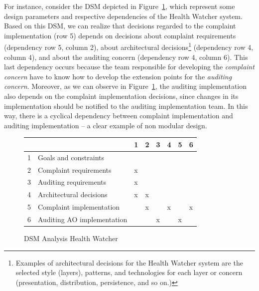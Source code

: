 For instance, consider the DSM depicted in Figure~\ref{dsm:hw01}, which represent
some design parameters and respective dependencies of the Health Watcher
system. Based on this DSM, we can realize that decisions regarded to the
complaint implementation (row 5) depends on decisions about complaint
requirements (dependency row 5, column 2), about architectural
decisions\footnote{Examples of architectural decisions for the Health Watcher
system are the selected style (layers), patterns, and technologies for each
layer or concern (presentation, distribution, persistence, and so on.)}
(dependency row 4, column 4), and about the auditing concern (dependency row 4,
column 6). This last dependency occurs because the team responsible for developing
the \emph{complaint concern} have to know how to develop the extension points for
the \emph{auditing concern}. Moreover, as we can observe in
Figure~\ref{dsm:hw01}, the auditing implementation also depends on the
complaint implementation decisions, since changes in its implementation should
be notified to the auditing implementation team. In this way, there is a
cyclical dependency between complaint implementation and auditing
implementation -- a clear example of non modular design.

\begin{figure}[htb]
\centering
\begin{scriptsize}
\begin{tabular}{|l|l|l|l|l|l|l|l|} \hline
  &                             & 1     & 2     & 3     & 4     & 5     & 6 \\ \hline
1 & Goals and constraints       &       &       &       &       &       &   \\ \hline
2 & Complaint requirements      & x     &       &       &       &       &   \\ \hline
3 & Auditing requirements       & x     &       &       &       &       &   \\ \hline
4 & Architectural decisions     & x     & x     &       &       &       &   \\ \hline
5 & Complaint implementation    &       & x     &       & x     &       & x \\ \hline
6 & Auditing AO implementation  &       &       & x     &       & x     &   \\  \hline
\end{tabular}
\end{scriptsize}
\caption{DSM Analysis Health Watcher}
\label{dsm:hw01}
\end{figure}


